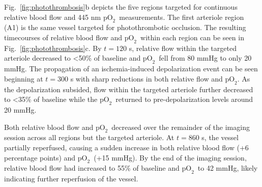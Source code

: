 \documentclass[12pt]{spieman}  %
\newcommand{\pO}{\ensuremath{\text{pO}_2}}
\begin{document}
\begin{spacing}{2}
Fig.~\ref{fig:photothrombosis}b depicts the five regions targeted for continuous relative blood flow and 445 nm \pO\ measurements. The first arteriole region (A1) is the same vessel targeted for photothrombotic occlusion. The resulting timecourses of relative blood flow and \pO\ within each region can be seen in Fig.~\ref{fig:photothrombosis}c. By $t = 120$ s, relative flow within the targeted arteriole decreased to \textless50\% of baseline and \pO\ fell from 80 mmHg to only 20 mmHg. The propagation of an ischemia-induced depolarization event \cite{Shin:2006dc,Dreier:2011gz} can be seen beginning at $t = 300$ s with sharp reductions in both relative flow and \pO. As the depolarization subsided, flow within the targeted arteriole further decreased to \textless35\% of baseline while the \pO\ returned to pre-depolarization levels around 20 mmHg.

Both relative blood flow and \pO\ decreased over the remainder of the imaging session across all regions but the targeted arteriole. At $t = 860$ s, the vessel partially reperfused, causing a sudden increase in both relative blood flow (+6 percentage points) and \pO\ (+15 mmHg). By the end of the imaging session, relative blood flow had increased to 55\% of baseline and \pO\ to 42 mmHg, likely indicating further reperfusion of the vessel.


\end{spacing}
\end{document}
